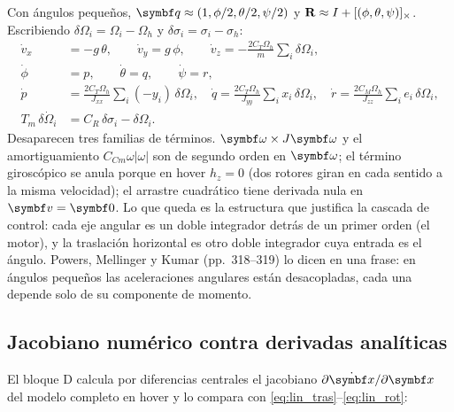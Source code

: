 Con ángulos pequeños, $\vect q\approx(1,\phi/2,\theta/2,\psi/2)$ y
$\mathbf{R}\approx I+[(\phi,\theta,\psi)]_{\times}$. Escribiendo
$\delta\Omega_i=\Omega_i-\Omega_h$ y $\delta\sigma_i=\sigma_i-\sigma_h$:
\begin{align}
\dot v_x &= -g\,\theta, \qquad \dot v_y = g\,\phi, \qquad
\dot v_z = -\frac{2C_T\Omega_h}{m}\sum_i\delta\Omega_i, \label{eq:lin_tras}\\
\dot\phi &= p,\qquad \dot\theta=q,\qquad \dot\psi=r, \label{eq:lin_cin}\\
\dot p &= \frac{2C_T\Omega_h}{J_{xx}}\sum_i(-y_i)\,\delta\Omega_i,\quad
\dot q = \frac{2C_T\Omega_h}{J_{yy}}\sum_i x_i\,\delta\Omega_i,\quad
\dot r = \frac{2C_M\Omega_h}{J_{zz}}\sum_i e_i\,\delta\Omega_i, \label{eq:lin_rot}\\
T_m\,\delta\dot\Omega_i &= C_R\,\delta\sigma_i - \delta\Omega_i. \label{eq:lin_mot}
\end{align}
Desaparecen tres familias de términos. $\vect\omega\times J\vect\omega$ y el
amortiguamiento $C_{Cm}\omega|\omega|$ son de segundo orden en $\vect\omega$;
el término giroscópico se anula porque en hover $h_z=0$ (dos rotores giran
en cada sentido a la misma velocidad); el arrastre cuadrático tiene
derivada nula en $\vect v=\vect0$. Lo que queda es la estructura que justifica
la cascada de control: cada eje angular es un doble integrador detrás de un
primer orden (el motor), y la traslación horizontal es otro doble integrador
cuya entrada es el ángulo. Powers, Mellinger y Kumar \cite{hb16} (pp.~318--319)
lo dicen en una frase: en ángulos pequeños las aceleraciones angulares
están desacopladas, cada una depende solo de su componente de momento.

\subsection{Jacobiano numérico contra derivadas analíticas}

El bloque D calcula por diferencias centrales el jacobiano $\partial\dot{\vect x}/\partial\vect x$
del modelo completo en hover y lo compara con \eqref{eq:lin_tras}--\eqref{eq:lin_rot}:

